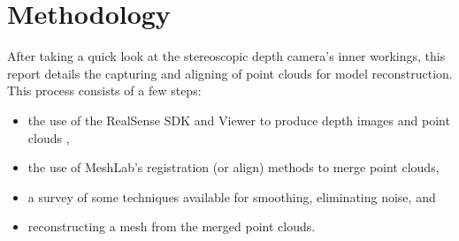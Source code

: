 \section{Methodology}
After taking a quick look at the stereoscopic depth camera's inner workings, this
report details the capturing and aligning of point clouds for model reconstruction.
This process consists of a few steps:

 \begin{itemize}
   \item the use of the RealSense SDK and Viewer to produce depth images and point clouds \cite{librealsense},
   \item the use of MeshLab's registration (or align) methods to merge point clouds,
   \item a survey of some techniques available for smoothing, eliminating noise, and
   \item reconstructing a mesh from the merged point clouds.
 \end{itemize}
